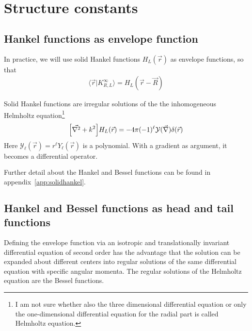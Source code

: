 \documentclass[11pt,a4paper]{report}
\begin{document}
\section{Structure constants}
\subsection{Hankel functions as envelope function}
In practice, we will use solid Hankel functions $H_L(\vec{r})$ as
envelope functions, so that 
\begin{eqnarray}
\langle\vec{r}|K^\infty_{R,L}\rangle= H_L(\vec{r}-\vec{R})
\end{eqnarray}

Solid Hankel functions are irregular solutions of the the
inhomogeneous Helmholtz equation\footnote{I am not sure whether also
  the three dimensional differential equation or only the
  one-dimensional differential equation for the radial part is called
  Helmholtz equation.}
\begin{eqnarray}
\Bigl[\vec{\nabla^2}+k^2\Bigr]H_{L}(\vec{r})
=-4\pi(-1)^\ell\mathcal{Y}(\vec{\nabla})\delta(\vec{r})
\label{eq:solidhelmholtzequation}
\end{eqnarray}
Here $\mathcal{Y}_\ell(\vec{r})=r^\ell Y_\ell(\vec{r})$ is a
polynomial. With a gradient as argument, it becomes a differential
operator.

Further detail about the Hankel and Bessel functions can be found in
appendix~\ref{app:solidhankel}.

\subsection{Hankel and Bessel functions as head and tail functions}
Defining the envelope function via an isotropic and translationally
invariant differential equation of second order has the advantage
that the solution can be expanded about different centers into regular
solutions of the same differential equation with specific angular
momenta. The regular solutions of the Helmholtz equation are the
Bessel functions.
\end{document}
